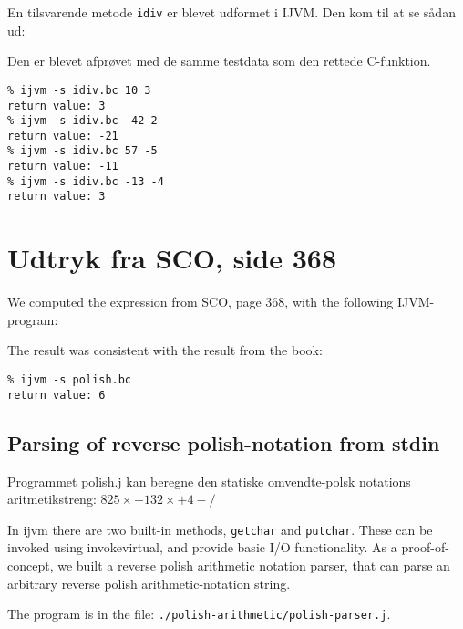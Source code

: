 \documentclass[12pt,a4paper]{article}
\begin{document}
\lstset{language=C}


En tilsvarende metode \texttt{idiv} er blevet udformet i IJVM. Den kom til at se sådan ud:

\lstset{language=JVMIS}


Den er blevet afprøvet med de samme testdata som den rettede C-funktion.

\lstset{language=sh}
\begin{lstlisting}
% ijvm -s idiv.bc 10 3
return value: 3
% ijvm -s idiv.bc -42 2
return value: -21
% ijvm -s idiv.bc 57 -5
return value: -11
% ijvm -s idiv.bc -13 -4
return value: 3
\end{lstlisting}

\section{Udtryk fra SCO, side 368}
We computed the expression from SCO, page 368, with the following IJVM-program:
\lstset{language=JVMIS}


The result was consistent with the result from the book:
\lstset{language=sh}
\begin{lstlisting}
% ijvm -s polish.bc
return value: 6
\end{lstlisting}

\subsection{Parsing of reverse polish-notation from stdin}
Programmet polish.j kan beregne den statiske omvendte-polsk notations aritmetikstreng:
$825\times+132\times+4-/$

In ijvm there are two built-in methods, \texttt{getchar} and \texttt{putchar}. These can be invoked using invokevirtual, and provide basic I/O functionality.
As a proof-of-concept, we built a reverse polish arithmetic notation parser, that can parse an arbitrary reverse polish arithmetic-notation string.

The program is in the file: \texttt{./polish-arithmetic/polish-parser.j}.
\end{document}
